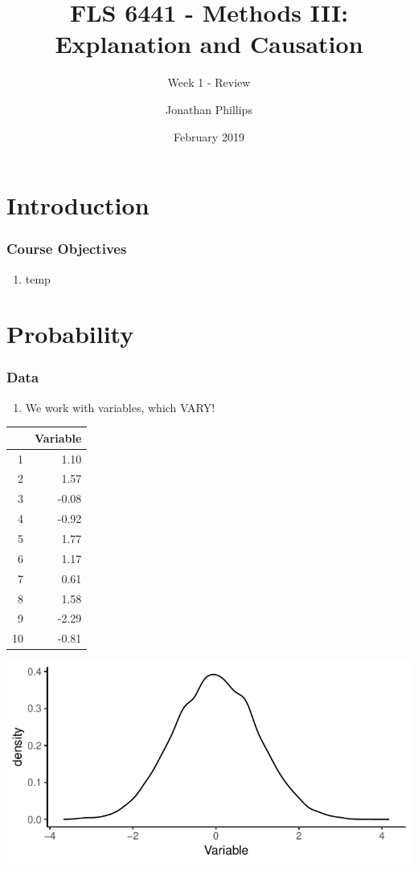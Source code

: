 \documentclass[xcolor=x11names,compress]{beamer}\usepackage[]{graphicx}\usepackage[]{color}
\title{FLS 6441 - Methods III: Explanation and Causation}
\subtitle{Week 1 - Review}
\author{Jonathan Phillips}
\date{February 2019}
\makeatletter
\def\maxwidth{ %
  \ifdim\Gin@nat@width>\linewidth
    \linewidth
  \else
    \Gin@nat@width
  \fi
}
\newenvironment{knitrout}{}{} %
\renewcommand{\(}{\begin{columns}}
\renewcommand{\)}{\end{columns}}
\newcommand{\<}[1]{\begin{column}{#1}}
\renewcommand{\>}{\end{column}}
\makeatother
\begin{document}
\frame{\titlepage}

\section{Introduction}

\begin{frame}
\frametitle{Course Objectives}
\begin{enumerate}
\item temp
\end{enumerate}
\end{frame}

\section{Probability}

\begin{frame}
\frametitle{Data}
\begin{enumerate}
\item We work with variables, which VARY!
\end{enumerate}
\begin{multicols}{2}
\begin{table}[ht]
\centering
\begin{tabular}{rr}
  \hline
 & Variable \\ 
  \hline
1 & 1.10 \\ 
  2 & 1.57 \\ 
  3 & -0.08 \\ 
  4 & -0.92 \\ 
  5 & 1.77 \\ 
  6 & 1.17 \\ 
  7 & 0.61 \\ 
  8 & 1.58 \\ 
  9 & -2.29 \\ 
  10 & -0.81 \\ 
   \hline
\end{tabular}
\end{table}

\columnbreak
\begin{knitrout}
\color{fgcolor}
\includegraphics[width=\maxwidth]{figure/var2-1} 

\end{knitrout}
\end{multicols}
\end{frame}
\end{document}
